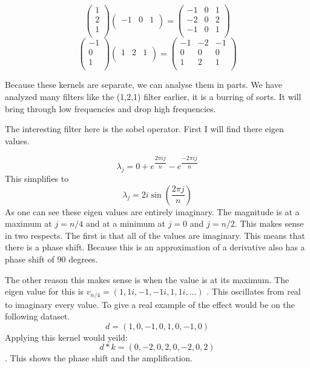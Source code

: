 \documentclass[11pt]{article}
\begin{document}
$$\begin{pmatrix}
	1\\
	2\\
	1\\
\end{pmatrix}\begin{pmatrix}
	-1 & 0 & 1\\
\end{pmatrix} = \begin{pmatrix}
	-1 & 0 & 1\\
	-2 & 0 & 2\\
	-1 & 0 & 1\\
\end{pmatrix}$$
$$\begin{pmatrix}
	-1\\
	0\\
	1\\
\end{pmatrix}\begin{pmatrix}
	1 & 2 & 1\\
\end{pmatrix} =\begin{pmatrix}
	-1 & -2 & -1\\
	0 & 0 & 0\\
	1 & 2 & 1\\
\end{pmatrix}$$

Because these kernels are separate, we can analyse them in parts. We have analyzed many filters like the (1,2,1) filter earlier, it is a burring of sorts. It will bring through low frequencies and drop high frequencies. 

The interesting filter here is the sobel operator. First I will find there eigen values.

$$\lambda_j = 0 + e^{\dfrac{2\pi i j}{n}}-e^{\dfrac{-2\pi i j}{n}}$$
This simplifies to
$$\lambda_j = 2i\sin(\dfrac{2 \pi j}{n})$$
As one can see these eigen values are entirely imaginary. The magnitude is at a maximum at $j=n/4$ and at a minimum at $j=0$ and $j=n/2$. This makes sense in two respects. The first is that all of the values are imaginary. This means that there is a phase shift. Because this is an approximation of a derivative also has a phase shift of 90 degrees.

The other reason this makes sense is when the value is at its maximum. The eigen value for this is $v_{n/4} = (1,1i,-1,-1i,1, 1i, ...)$ . This oscillates from real to imaginary every value. To give a real example of the effect would be on the following dataset. 
$$d = (1,0,-1,0,1,0,-1,0)$$
Applying this kernel would yeild:
$$d*k = (0,-2,0,2,0,-2,0,2)$$. 
This shows the phase shift and the amplification. 
\end{document}
